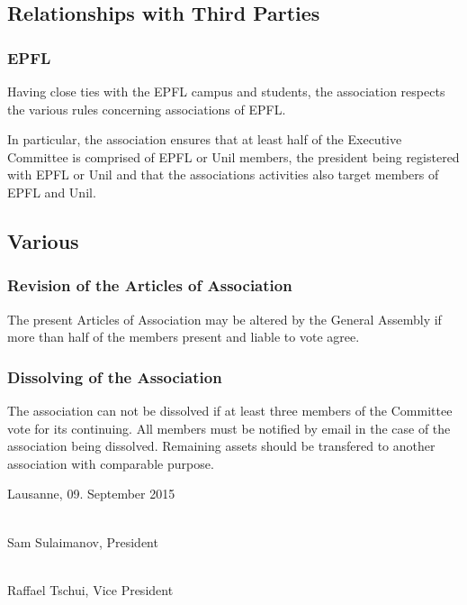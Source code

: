 \documentclass[12pt,a4paper,oneside]{article}
\newcounter{art}
\newcommand{\english}{    \switchcolumn[0]\noindent}
\begin{document}
\begin{paracol}{2}
\english
	\subsection{Relationships with Third Parties}

	\subsubsection{EPFL}
	Having close ties with the EPFL campus and students, the association respects the various rules concerning associations of EPFL.

	In particular, the association ensures that at least half of the Executive Committee is comprised of EPFL or Unil members, the president being registered with EPFL or Unil and that the associations activities also target members of EPFL and Unil. 




\english
	\subsection{Various}

	\english
	\subsubsection{Revision of the Articles of Association}\stepcounter{art}
	The present Articles of Association may be altered by the General Assembly if more than half of the members present and liable to vote agree. 

	\english
	\subsubsection{Dissolving of the Association}\stepcounter{art}
	The association can not be dissolved if at least three members of the Committee vote for its continuing.
	All members must be notified by email in the case of the association being dissolved.
	Remaining assets should be transfered to another association with comparable purpose.


\english
	\vspace{\fill}
	
	\noindent
	Lausanne, 09. September 2015
	\vspace {1.5cm}

	\noindent
	\hrulefill \\
	Sam Sulaimanov, President

	\vspace {1.0cm}
 	\noindent 
 	\hrulefill \\
 	Raffael Tschui, Vice President
	

 	

	
	

\clearpage





\end{paracol}
\end{document}
